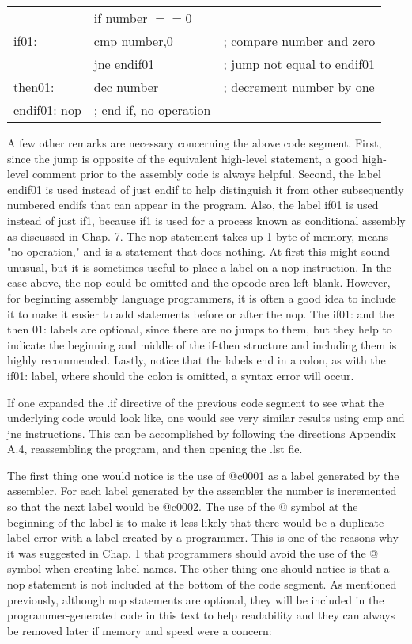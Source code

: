 \documentclass[10pt]{article}
\begin{document}
\begin{center}
\begin{tabular}{lll}
 & if number $==0$ &  \\
if01: & cmp number,0 & ; compare number and zero \\
 & jne endif01 & ; jump not equal to endif01 \\
then01: & dec number & ; decrement number by one \\
endif01: nop & ; end if, no operation &  \\
\end{tabular}
\end{center}

A few other remarks are necessary concerning the above code segment. First, since the jump is opposite of the equivalent high-level statement, a good high-level comment prior to the assembly code is always helpful. Second, the label endif01 is used instead of just endif to help distinguish it from other subsequently numbered endifs that can appear in the program. Also, the label if01 is used instead of just if1, because if1 is used for a process known as conditional assembly as discussed in Chap. 7. The nop statement takes up 1 byte of memory, means "no operation," and is a statement that does nothing. At first this might sound unusual, but it is sometimes useful to place a label on a nop instruction. In the case above, the nop could be omitted and the opcode area left blank. However, for beginning assembly language programmers, it is often a good idea to include it to make it easier to add statements before or after the nop. The if01: and the then 01: labels are optional, since there are no jumps to them, but they help to indicate the beginning and middle of the if-then structure and including them is highly recommended. Lastly, notice that the labels end in a colon, as with the if01: label, where should the colon is omitted, a syntax error will occur.

If one expanded the .if directive of the previous code segment to see what the underlying code would look like, one would see very similar results using cmp and jne instructions. This can be accomplished by following the directions Appendix A.4, reassembling the program, and then opening the .lst fie.

The first thing one would notice is the use of @c0001 as a label generated by the assembler. For each label generated by the assembler the number is incremented so that the next label would be @c0002. The use of the @ symbol at the beginning of the label is to make it less likely that there would be a duplicate label error with a label created by a programmer. This is one of the reasons why it was suggested in Chap. 1 that programmers should avoid the use of the @ symbol when creating label names. The other thing one should notice is that a nop statement is not included at the bottom of the code segment. As mentioned previously, although nop statements are optional, they will be included in the programmer-generated code in this text to help readability and they can always be removed later if memory and speed were a concern:
\end{document}
